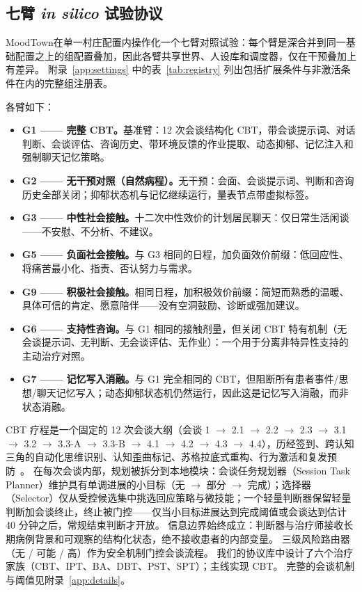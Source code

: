 \documentclass[11pt,a4paper]{article}
\newcommand{\sys}{MoodTown}
\begin{document}
\subsection{七臂 \emph{in silico} 试验协议}\label{sec:arms}

\sys 在单一村庄配置内操作化一个七臂对照试验：每个臂是深合并到同一基础配置之上的组配置叠加，因此各臂共享世界、人设库和调度器，仅在干预叠加上有差异。
附录~\ref{app:settings} 中的表~\ref{tab:registry} 列出包括扩展条件与非激活条件在内的完整组注册表。

各臂如下：
\begin{itemize}
\item \textbf{G1 —— 完整 CBT。}基准臂：12 次会谈结构化 CBT，带会谈提示词、对话判断、会谈评估、咨询历史、带环境反馈的作业提取、动态抑郁、记忆注入和强制聊天记忆策略。
\item \textbf{G2 —— 无干预对照（自然病程）。}无干预：会面、会谈提示词、判断和咨询历史全部关闭；抑郁状态机与记忆继续运行，量表节点带虚拟标签。
\item \textbf{G3 —— 中性社会接触。}十二次中性效价的计划居民聊天：仅日常生活闲谈——不安慰、不分析、不建议。
\item \textbf{G5 —— 负面社会接触。}与 G3 相同的日程，加负面效价前缀：低回应性、将痛苦最小化、指责、否认努力与需求。
\item \textbf{G9 —— 积极社会接触。}相同日程，加积极效价前缀：简短而熟悉的温暖、具体可信的肯定、愿意陪伴——没有空洞鼓励、诊断或强加建议。
\item \textbf{G6 —— 支持性咨询。}与 G1 相同的接触剂量，但关闭 CBT 特有机制（无会谈提示词、无判断、无会谈评估、无作业）：一个用于分离非特异性支持的主动治疗对照。
\item \textbf{G7 —— 记忆写入消融。}与 G1 完全相同的 CBT，但阻断所有患者事件/思想/聊天记忆写入；动态抑郁状态机仍然运行，因此这是记忆写入消融，而非状态消融。
\end{itemize}

CBT 疗程是一个固定的 12 次会谈大纲（会谈 1 $\rightarrow$ 2.1 $\rightarrow$ 2.2 $\rightarrow$ 2.3 $\rightarrow$ 3.1 $\rightarrow$ 3.2 $\rightarrow$ 3.3-A $\rightarrow$ 3.3-B $\rightarrow$ 4.1 $\rightarrow$ 4.2 $\rightarrow$ 4.3 $\rightarrow$ 4.4），历经签到、跨认知三角的自动化思维识别、认知歪曲标记、苏格拉底式重构、行为激活和复发预防~\citep{beck1979}。
在每次会谈内部，规划被拆分到本地模块：会谈任务规划器（Session Task Planner）维护具有单调进展的小目标（无 $\rightarrow$ 部分 $\rightarrow$ 完成）；选择器（Selector）仅从受控候选集中挑选回应策略与微技能；一个轻量判断器保留轻量判断加会谈终止，终止被门控——仅当小目标进展达到完成阈值或会谈达到估计 40 分钟之后，常规结束判断才开放。
信息边界始终成立：判断器与治疗师接收长期病例背景和可观察的结构化状态，绝不接收患者的内部变量。
三级风险路由器（无 / 可能 / 高）作为安全机制门控会谈流程。
我们的协议库中设计了六个治疗家族（CBT、IPT、BA、DBT、PST、SPT）；主线实现 CBT。
完整的会谈机制与阈值见附录~\ref{app:details}。
\end{document}
